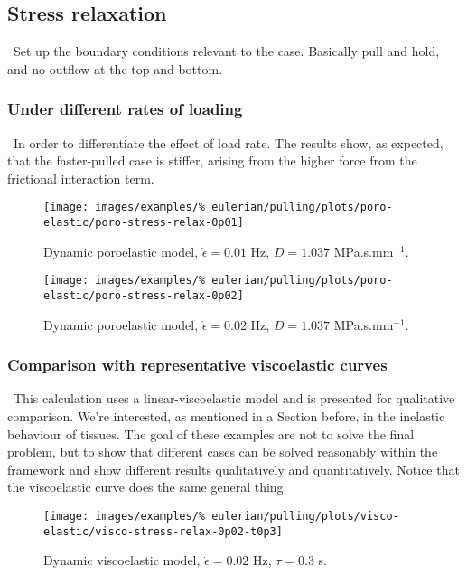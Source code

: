 \subsection{Stress relaxation}
\label{stress-relaxation}

\textbullet\ Set up the boundary conditions relevant to the
case. Basically pull and hold, and no outflow at the top and
bottom.

\subsubsection{Under different rates of loading}
\label{modifying-load-rates}

\textbullet\ In order to differentiate the effect of load rate. The
results show, as expected, that the faster-pulled case is stiffer,
arising from the higher force from the frictional interaction term.

\begin{figure}[!hptb]
\centering
\texttt{[image: images/examples/\%
eulerian/pulling/plots/poro-elastic/poro-stress-relax-0p01]}
\caption{Dynamic poroelastic model, $\dot{\epsilon}=0.01$ Hz, $D=1.037$
  MPa.s.mm$^{-1}$.}
\label{poro-stress-relax-0p01}
\end{figure}

\begin{figure}[!hptb]
\centering
\texttt{[image: images/examples/\%
eulerian/pulling/plots/poro-elastic/poro-stress-relax-0p02]}
\caption{Dynamic poroelastic model, $\dot{\epsilon}=0.02$ Hz, $D=1.037$
  MPa.s.mm$^{-1}$.}
\label{poro-stress-relax-0p02}
\end{figure}

\subsubsection{Comparison with representative viscoelastic curves}
\label{viscoelastic-stress-relaxation}

\textbullet\ This calculation uses a linear-viscoelastic model and is
presented for qualitative comparison. We're interested, as mentioned
in a Section before, in the inelastic behaviour of tissues. The goal
of these examples are not to solve the final problem, but to show that
different cases can be solved reasonably within the framework and show
different results qualitatively and quantitatively. Notice that the
viscoelastic curve does the same general thing.

\begin{figure}[!hptb]
\centering
\texttt{[image: images/examples/\%
eulerian/pulling/plots/visco-elastic/visco-stress-relax-0p02-t0p3]}
\caption{Dynamic viscoelastic model, $\dot{\epsilon}=0.02$ Hz,
  $\tau=0.3$ s.}
\label{visco-stress-relax-0p02-t0p3}
\end{figure}

